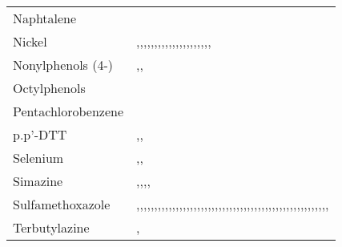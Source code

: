 \begin{tabular}{ll}
\cline{1-2}
Naphtalene & \cite{Teijon_2010} \\
\cline{1-2}
Nickel & \cite{Lester_1979},\cite{Yoshida_2015},\cite{Feng_2018},\cite{Teijon_2010},\cite{Marzougui_2018},\cite{Buzier_2006},\cite{Orescanin_2013},\cite{Busetti_2005},\cite{Goldstone_1990},\cite{Choubert_2011},\cite{Moriyama_1988},\cite{Drozdova_2018},\cite{Honarmandrad_2020},\cite{Hargreaves_2016},\cite{KATSOYIANNIS20042685},\cite{Karvelas_2003},\cite{Chen_2021},\cite{Lester_1983},\cite{Mansourri_2016},\cite{Mailler_2013},\cite{Zhou_2018},\cite{OLIVER_1974} \\
\cline{1-2}
Nonylphenols (4-) & \cite{Lema_2017},\cite{Mailler_2013},\cite{Echevarr_a_2019} \\
\cline{1-2}
Octylphenols & \cite{Mailler_2013} \\
\cline{1-2}
Pentachlorobenzene & \cite{Teijon_2010} \\
\cline{1-2}
p.p'-DTT & \cite{Ormad_2008},\cite{RAHMANI201882},\cite{Katsoyiannis_2004} \\
\cline{1-2}
Selenium & \cite{Okonji_2021},\cite{Ali_2021},\cite{Zhou_2018} \\
\cline{1-2}
Simazine & \cite{Teijon_2010},\cite{Mailler_2013},\cite{RAHMANI201882},\cite{Ormad_2008},\cite{Gorito_2021} \\
\cline{1-2}
Sulfamethoxazole & \cite{Phillips_2015},\cite{Bradshaw_2015},\cite{Hai_2011},\cite{Liu_2017},\cite{Kim_2009},\cite{Zhang_2021},\cite{Kruithof2007-os},\cite{Dan_A_2013},\cite{Coutu_2013},\cite{Chandurvelan_2015},\cite{Echevarr_a_2019},\cite{Ortiz_de_Garc_a_2013},\cite{Teijon_2010},\cite{G_mez_Ramos_2011},\cite{Zhang_2017},\cite{Cai_2018},\cite{Beltr_n_2008},\cite{ter_Laak_2014},\cite{Hai_2020},\cite{Dantas_2008},\cite{Larcher_2012},\cite{Rizzo_2019},\cite{Tewari_2013},\cite{Nasuhoglu_2011},\cite{Ramos_2015},\cite{Br_ckner_2020},\cite{Al_Aukidy_2012},\cite{Subedi_2017},\cite{Kim_2015},\cite{Gracia_Lor_2012},\cite{Hu_2015},\cite{Johnson_2017},\cite{Radjenovic2009-ud},\cite{Lan_Chun_2015},\cite{Escol_Casas_2015},\cite{Wei_2019},\cite{Javid2020-ch},\cite{Casta_o_Trias_2020},\cite{Kang_2018},\cite{Straub_2015},\cite{Mart_nez_Costa_2018},\cite{Yan_2014},\cite{Zhang_2016},\cite{Woznicki_2015},\cite{Garoma_2010},\cite{Marug_n_2020},\cite{Shahmahdi_2020},\cite{Yuan_2015},\cite{Nichols_2015},\cite{Staley_2015},\cite{Batt_2007},\cite{Navedo_2015},\cite{Song_2021},\cite{Carballa_2008},\cite{K_mmerer_2003} \\
\cline{1-2}
Terbutylazine & \cite{Ormad_2008},\cite{RAHMANI201882} \\

\end{tabular}
